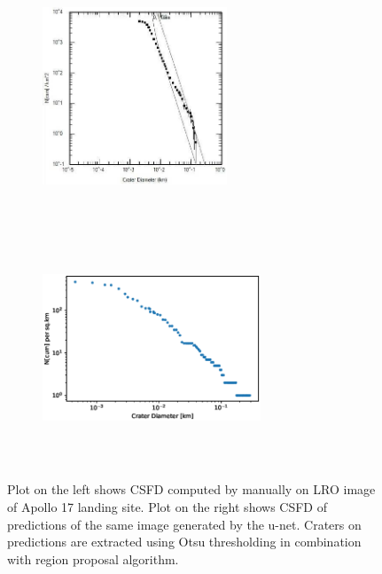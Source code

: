 \documentclass[11pt]{article}
\begin{document}
	


%


\begin{figure}[H]
	\begin{subfigure}{7cm}
		\centering\includegraphics[width=5.5cm, height=7cm]{files/results/dino_csfd.jpg}\hfill
	\end{subfigure}
	\begin{subfigure}{7cm}
		\centering\includegraphics[width=6.5cm, height=7cm]{files/results/csfd.eps}

	\end{subfigure}
		\caption{Plot on the left shows CSFD computed by \cite{dino2020} manually on LRO image of Apollo 17 landing site. Plot on the right shows CSFD of predictions of the same image generated by the u-net. Craters on predictions are extracted using Otsu thresholding in combination with region proposal algorithm.}
		\label{age}
\end{figure}
\end{document}
